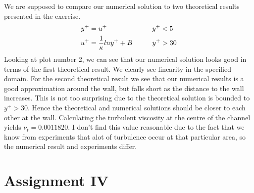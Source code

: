\documentclass[a4paper,norsk]{article}
\begin{document}
We are supposed to compare our numerical solution to two theoretical results presented in the exercise. 
\begin{align*}
y^+ &= u^+ \hspace{2.3cm} y^+ < 5 \\
u^+ &= \frac{1}{\kappa}ln y^+ + B \hspace{1cm} y^+ > 30 
\end{align*}
Looking at plot number 2, we can see that our numerical solution looks good in terms of the first theoretical 
result. We clearly see linearity in the specified domain. \newline 
For the second theoretical result we see that our numerical results is a good approximation around the wall, but 
falls short as the distance to the wall increases. This is not too surprising due to the theoretical solution is bounded to $y^+ > 30 $. Hence the theoretical and numerical solutions should be closer to each other at the wall.
Calculating the turbulent viscosity at the centre of the channel yields $\nu_t = 0.0011820$. I don't find this value reasonable due to the fact that we know from experiments that alot of turbulence occur at that particular area, so the numerical result and experiments differ.


\newpage
\section*{Assignment IV}
\end{document}
